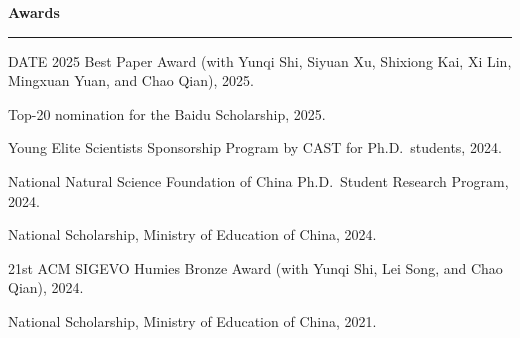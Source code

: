 \documentclass[10pt,a4paper]{article}
\newcommand{\cvsection}[1]{%
  \vspace{0.65em}%
  \noindent\textbf{\large #1}\\[-0.15em]
  \rule{\textwidth}{0.4pt}%
  \vspace{0.4em}%
}
\begin{document}
\cvsection{Awards}
\begin{cvbullet}
  \item DATE 2025 Best Paper Award (with Yunqi Shi, Siyuan Xu, Shixiong Kai, Xi Lin, Mingxuan Yuan, and Chao Qian), 2025.
  \item Top-20 nomination for the Baidu Scholarship, 2025.
  \item Young Elite Scientists Sponsorship Program by CAST for Ph.D.\ students, 2024.
  \item National Natural Science Foundation of China Ph.D.\ Student Research Program, 2024.
  \item National Scholarship, Ministry of Education of China, 2024.
  \item 21st ACM SIGEVO Humies Bronze Award (with Yunqi Shi, Lei Song, and Chao Qian), 2024.
  \item National Scholarship, Ministry of Education of China, 2021.
\end{cvbullet}
\end{document}

